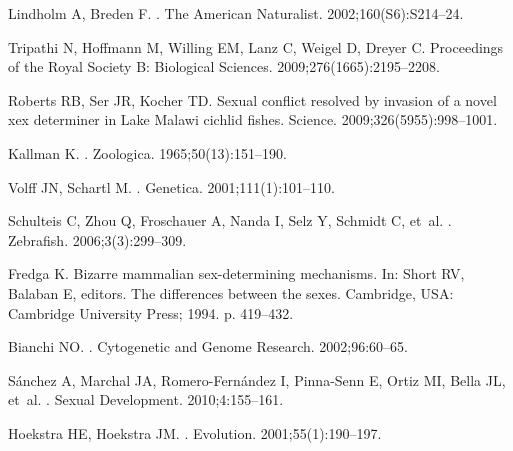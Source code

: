 \documentclass[10pt,letterpaper]{article}
\begin{document}
\begin{thebibliography}{100}
Lindholm A, Breden F.
.
\newblock The American Naturalist. 2002;160(S6):S214--24.

Tripathi N, Hoffmann M, Willing EM, Lanz C, Weigel D, Dreyer C.
\newblock Proceedings of the Royal Society B: Biological Sciences.
  2009;276(1665):2195--2208.

Roberts RB, Ser JR, Kocher TD.
\newblock Sexual conflict resolved by invasion of a novel xex determiner in
  Lake Malawi cichlid fishes.
\newblock Science. 2009;326(5955):998--1001.

Kallman K.
.
\newblock Zoologica. 1965;50(13):151--190.

Volff JN, Schartl M.
.
\newblock Genetica. 2001;111(1):101--110.

Schulteis C, Zhou Q, Froschauer A, Nanda I, Selz Y, Schmidt C, et~al.
.
\newblock Zebrafish. 2006;3(3):299--309.

Fredga K.
\newblock Bizarre mammalian sex-determining mechanisms.
\newblock In: Short RV, Balaban E, editors. The differences between the sexes.
  Cambridge, USA: Cambridge University Press; 1994. p. 419--432.

Bianchi NO.
.
\newblock Cytogenetic and Genome Research. 2002;96:60--65.

S{\'a}nchez A, Marchal JA, Romero-Fern{\'a}ndez I, Pinna-Senn E, Ortiz MI,
  Bella JL, et~al.
.
\newblock Sexual Development. 2010;4:155--161.

Hoekstra HE, Hoekstra JM.
.
\newblock Evolution. 2001;55(1):190--197.


\end{thebibliography}
\end{document}
